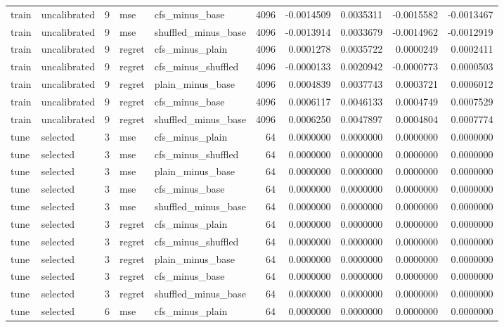 \begin{tabular}{llrllrrrrr}
train & uncalibrated & 9 & mse & cfs_minus_base & 4096 & -0.0014509 & 0.0035311 & -0.0015582 & -0.0013467 \\
train & uncalibrated & 9 & mse & shuffled_minus_base & 4096 & -0.0013914 & 0.0033679 & -0.0014962 & -0.0012919 \\
train & uncalibrated & 9 & regret & cfs_minus_plain & 4096 & 0.0001278 & 0.0035722 & 0.0000249 & 0.0002411 \\
train & uncalibrated & 9 & regret & cfs_minus_shuffled & 4096 & -0.0000133 & 0.0020942 & -0.0000773 & 0.0000503 \\
train & uncalibrated & 9 & regret & plain_minus_base & 4096 & 0.0004839 & 0.0037743 & 0.0003721 & 0.0006012 \\
train & uncalibrated & 9 & regret & cfs_minus_base & 4096 & 0.0006117 & 0.0046133 & 0.0004749 & 0.0007529 \\
train & uncalibrated & 9 & regret & shuffled_minus_base & 4096 & 0.0006250 & 0.0047897 & 0.0004804 & 0.0007774 \\
tune & selected & 3 & mse & cfs_minus_plain & 64 & 0.0000000 & 0.0000000 & 0.0000000 & 0.0000000 \\
tune & selected & 3 & mse & cfs_minus_shuffled & 64 & 0.0000000 & 0.0000000 & 0.0000000 & 0.0000000 \\
tune & selected & 3 & mse & plain_minus_base & 64 & 0.0000000 & 0.0000000 & 0.0000000 & 0.0000000 \\
tune & selected & 3 & mse & cfs_minus_base & 64 & 0.0000000 & 0.0000000 & 0.0000000 & 0.0000000 \\
tune & selected & 3 & mse & shuffled_minus_base & 64 & 0.0000000 & 0.0000000 & 0.0000000 & 0.0000000 \\
tune & selected & 3 & regret & cfs_minus_plain & 64 & 0.0000000 & 0.0000000 & 0.0000000 & 0.0000000 \\
tune & selected & 3 & regret & cfs_minus_shuffled & 64 & 0.0000000 & 0.0000000 & 0.0000000 & 0.0000000 \\
tune & selected & 3 & regret & plain_minus_base & 64 & 0.0000000 & 0.0000000 & 0.0000000 & 0.0000000 \\
tune & selected & 3 & regret & cfs_minus_base & 64 & 0.0000000 & 0.0000000 & 0.0000000 & 0.0000000 \\
tune & selected & 3 & regret & shuffled_minus_base & 64 & 0.0000000 & 0.0000000 & 0.0000000 & 0.0000000 \\
tune & selected & 6 & mse & cfs_minus_plain & 64 & 0.0000000 & 0.0000000 & 0.0000000 & 0.0000000 \\

\end{tabular}
